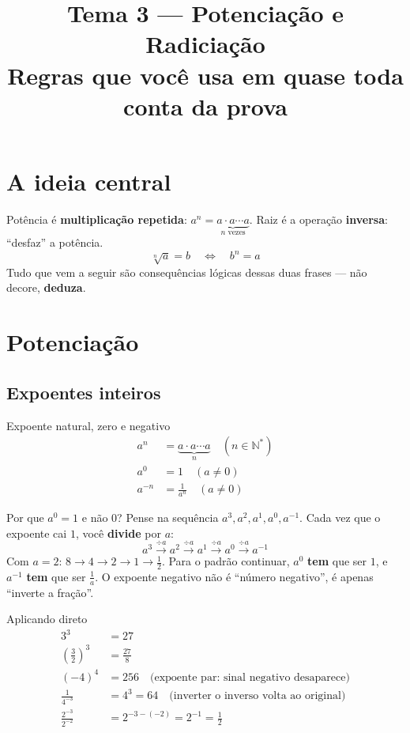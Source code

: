 \documentclass[12pt,a4paper]{article}
\title{\vspace{-1.5cm}\textbf{Tema 3 — Potenciação e Radiciação}\\[2pt]\large Regras que você usa em quase toda conta da prova}
\author{}
\date{}
\begin{document}
\maketitle
\thispagestyle{empty}

\section*{A ideia central}
Potência é \textbf{multiplicação repetida}: $a^n = \underbrace{a\cdot a\cdots a}_{n\text{ vezes}}$.
Raiz é a operação \textbf{inversa}: ``desfaz'' a potência.
\[
\sqrt[n]{a} = b \quad\Longleftrightarrow\quad b^n = a
\]
Tudo que vem a seguir são consequências lógicas dessas duas frases — não
decore, \textbf{deduza}.

\section{Potenciação}

\subsection{Expoentes inteiros}

\begin{definicao}{Expoente natural, zero e negativo}
\begin{align*}
a^n &= \underbrace{a \cdot a \cdots a}_{n} \quad (n \in \mathbb{N}^*)\\[4pt]
a^0 &= 1 \quad (a \neq 0)\\[4pt]
a^{-n} &= \frac{1}{a^n} \quad (a \neq 0)
\end{align*}
\end{definicao}

\begin{dica}{Por que $a^0=1$ e não $0$?}
Pense na sequência $a^3, a^2, a^1, a^0, a^{-1}$. Cada vez que o expoente cai
$1$, você \textbf{divide} por $a$:
\[
a^3 \xrightarrow{\div a} a^2 \xrightarrow{\div a} a^1 \xrightarrow{\div a} a^0 \xrightarrow{\div a} a^{-1}
\]
Com $a=2$: $8 \to 4 \to 2 \to 1 \to \tfrac12$. Para o padrão continuar, $a^0$
\textbf{tem} que ser $1$, e $a^{-1}$ \textbf{tem} que ser $\tfrac1a$. O
expoente negativo não é ``número negativo'', é apenas ``inverte a fração''.
\end{dica}

\begin{exemplo}{Aplicando direto}
\begin{align*}
3^3 &= 27\\
\left(\tfrac{3}{2}\right)^3 &= \tfrac{27}{8}\\
(-4)^4 &= 256 \quad\text{(expoente par: sinal negativo desaparece)}\\
\frac{1}{4^{-3}} &= 4^3 = 64 \quad\text{(inverter o inverso volta ao original)}\\
\frac{2^{-3}}{2^{-2}} &= 2^{-3-(-2)} = 2^{-1} = \tfrac12
\end{align*}
\end{exemplo}
\end{document}
